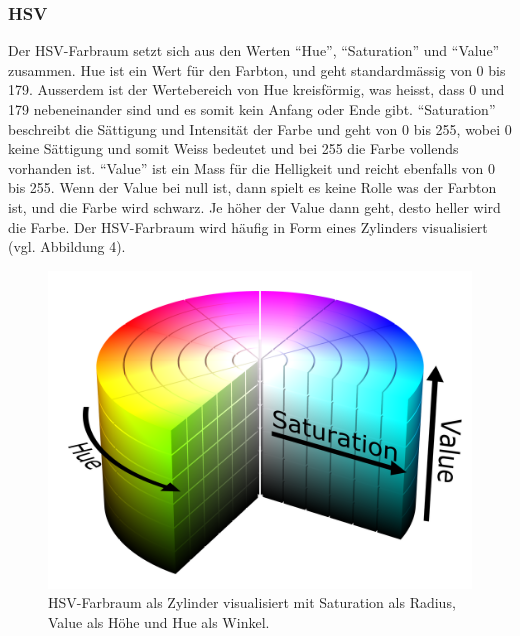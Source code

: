 \documentclass[a4paper, 12pt]{article}
\begin{document}
\subsubsection{HSV}
Der HSV-Farbraum setzt sich aus den Werten "`Hue"', "`Saturation"' und "`Value"' zusammen. Hue ist ein Wert für den Farbton, und geht standardmässig von 0 bis 179. Ausserdem ist der Wertebereich von Hue kreisförmig, was heisst, dass 0 und 179 nebeneinander sind und es somit kein Anfang oder Ende gibt.
\newline
"`Saturation"' beschreibt die Sättigung und Intensität der Farbe und geht von 0 bis 255, wobei 0 keine Sättigung und somit Weiss bedeutet und bei 255 die Farbe vollends vorhanden ist.
\newline
"`Value"' ist ein Mass für die Helligkeit und reicht ebenfalls von 0 bis 255. Wenn der Value bei null ist, dann spielt es keine Rolle was der Farbton ist, und die Farbe wird schwarz. Je höher der Value dann geht, desto heller wird die Farbe. \cite{RGBHSV}
\newline
Der HSV-Farbraum wird häufig in Form eines Zylinders visualisiert (vgl. Abbildung 4).
\begin{figure}[h]
\includegraphics[scale=0.07]{HSV_Zylinder} 
\caption{HSV-Farbraum als Zylinder visualisiert mit Saturation als Radius, Value als Höhe und Hue als Winkel. \cite{RGBHSV}}
\end{figure}
\end{document}
